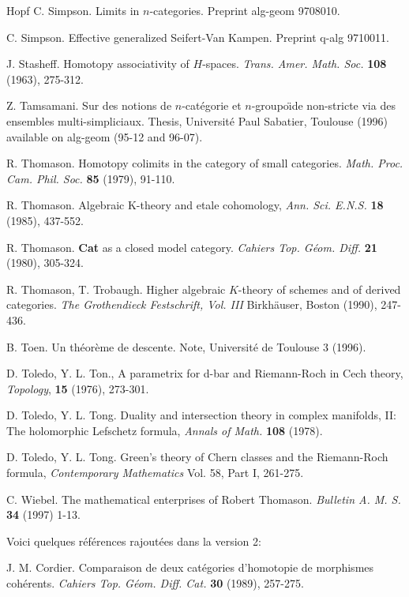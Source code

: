 \documentclass[12pt]{article}
\begin{document}
\begin{thebibliography}{Hopf}
C. Simpson. Limits in $n$-categories. Preprint alg-geom 9708010.

C. Simpson. Effective generalized Seifert-Van Kampen.
Preprint q-alg 9710011.

J. Stasheff. Homotopy associativity of $H$-spaces. {\em Trans. Amer. Math.
Soc.} {\bf 108} (1963), 275-312.


Z. Tamsamani.  Sur des notions de $n$-cat\'egorie et $n$-groupo\"{\i}de non-stricte
via des ensembles multi-simpliciaux. Thesis, Universit\'e Paul Sabatier,
Toulouse (1996) available on alg-geom (95-12 and 96-07).

R. Thomason. Homotopy colimits in the category of small categories. {\em Math.
Proc. Cam. Phil. Soc.} {\bf 85} (1979), 91-110.

R. Thomason.  Algebraic K-theory and etale cohomology, {\em Ann. Sci. E.N.S.}
{\bf 18} (1985), 437-552.

R. Thomason. {\bf Cat} as a closed model category. {\em Cahiers Top.
G\'eom. Diff.} {\bf 21}
(1980), 305-324.

R. Thomason, T. Trobaugh. Higher algebraic $K$-theory of schemes and of
derived categories.
{\em The Grothendieck Festschrift, Vol. III} Birkh\"auser, Boston (1990),
247-436.

B. Toen. Un th\'eor\`eme de descente. Note, Universit\'e de
Toulouse 3 (1996).


D. Toledo,  Y. L. Ton., A parametrix for {d-bar}  and Riemann-Roch in Cech
theory, {\em Topology}, {\bf 15} (1976),  273-301.

D. Toledo, Y. L. Tong. Duality and intersection theory in complex
manifolds, II:  The holomorphic Lefschetz formula, {\em Annals of Math.} {\bf
108} (1978).


D. Toledo, Y. L. Tong. Green's theory of Chern classes and the
Riemann-Roch formula, {\em  Contemporary Mathematics} Vol. 58, Part I, 261-275.

C. Wiebel. The mathematical enterprises of Robert Thomason. {\em
Bulletin A. M. S.} {\bf 34} (1997) 1-13.

Voici quelques r\'ef\'erences rajout\'ees dans  la version 2:

J. M. Cordier. Comparaison de deux cat\'egories d'homotopie de morphismes
coh\'erents. {\em Cahiers Top. G\'eom. Diff. Cat.} {\bf 30} (1989),
257-275.


\end{thebibliography}
\end{document}
